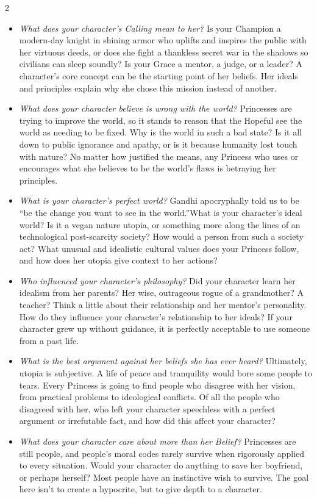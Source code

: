 \begin{multicols}{2}
\begin{itemize}
 \item \emph{What does your character's Calling mean to her?} Is your Champion a modern-day knight in shining armor who uplifts and inspires the public with her virtuous deeds, or does she fight a thankless secret war in the shadows so civilians can sleep soundly? Is your Grace a mentor, a judge, or a leader? A character's core concept can be the starting point of her beliefs. Her ideals and principles explain why she chose this mission instead of another. 
 \item \emph{What does your character believe is wrong with the world?} Princesses are trying to improve the world, so it stands to reason that the Hopeful see the world as needing to be fixed. Why is the world in such a bad state? Is it all down to public ignorance and apathy, or is it because humanity lost touch with nature? No matter how justified the means, any Princess who uses or encourages what she believes to be the world's flaws is betraying her principles. 
 \item \emph{What is your character's perfect world?} Gandhi apocryphally told us to be \textquotedblleft be the change you want to see in the world.\textquotedblright What is your character's ideal world? Is it a vegan nature utopia, or something more along the lines of an technological post-scarcity society? How would a person from such a society act? What unusual and idealistic cultural values does your Princess follow, and how does her utopia give context to her actions?
 \item \emph{Who influenced your character's philosophy?} Did your character learn her idealism from her parents? Her wise, outrageous rogue of a grandmother? A teacher? Think a little about their relationship and her mentor's personality. How do they influence your character's relationship to her ideals? If your character grew up without guidance, it is perfectly acceptable to use someone from a past life. 
 \item \emph{What is the best argument against her beliefs she has ever heard?} Ultimately, utopia is subjective. A life of peace and tranquility would bore some people to tears. Every Princess is going to find people who disagree with her vision, from practical problems to ideological conflicts. Of all the people who disagreed with her, who left your character speechless with a perfect argument or irrefutable fact, and how did this affect your character?
 \item \emph{What does your character care about more than her Belief?} Princesses are still people, and people's moral codes rarely survive when rigorously applied to every situation. Would your character do anything to save her boyfriend, or perhaps herself? Most people have an instinctive wish to survive. The goal here isn't to create a hypocrite, but to give depth to a character. 
\end{itemize}


\end{multicols}
